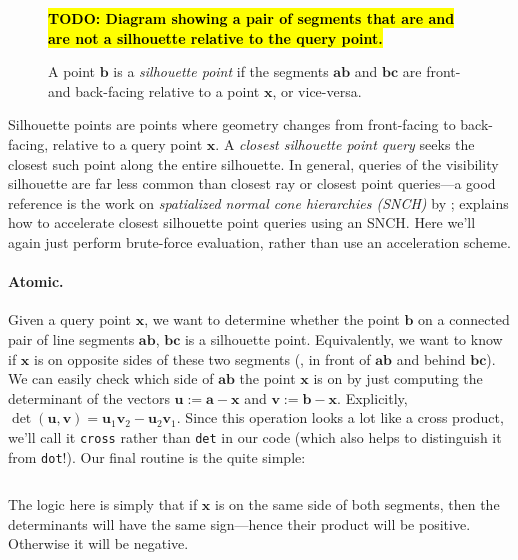 \documentclass{article}
\newcommand{\code}[1]{\texttt{#1}}
\newcommand{\todo}[1]{\textbf{\hl{TODO: #1}}}
\renewcommand{\vec}[1]{\textbf{#1}}
\begin{document}
\begin{figure}[h!]
   \todo{Diagram showing a pair of segments that are and are not a silhouette relative to the query point.}
   \caption{A point \(\vec{b}\) is a \emph{silhouette point} if the segments \(\vec{a}\vec{b}\) and \(\vec{b}\vec{c}\) are front- and back-facing relative to a point \(\vec{x}\), or vice-versa.}
\end{figure}

Silhouette points are points where geometry changes from front-facing to back-facing, relative to a query point \(\vec{x}\).  A \emph{closest silhouette point query} seeks the closest such point along the entire silhouette.  In general, queries of the visibility silhouette are far less common than closest ray or closest point queries---a good reference is the work on \emph{spatialized normal cone hierarchies (SNCH)} by \citet{johnson2001spatialized}; \citet[Section 5.1]{Sawhney:2023:WoSt} explains how to accelerate closest silhouette point queries using an SNCH.  Here we'll again just perform brute-force evaluation, rather than use an acceleration scheme.

\paragraph{Atomic.} Given a query point \(\vec{x}\), we want to determine whether the point \(\vec{b}\) on a connected pair of line segments \(\vec{a}\vec{b}\), \(\vec{b}\vec{c}\) is a silhouette point.  Equivalently, we want to know if \(\vec{x}\) is on opposite sides of these two segments (\eg{}, in front of \(\vec{a}\vec{b}\) and behind \(\vec{b}\vec{c}\)).  We can easily check which side of \(\vec{a}\vec{b}\) the point \(\vec{x}\) is on by just computing the determinant of the vectors \(\vec{u} := \vec{a}-\vec{x}\) and \(\vec{v} := \vec{b}-\vec{x}\).  Explicitly, \(\det(\vec{u},\vec{v}) = \vec{u}_1 \vec{v}_2 - \vec{u}_2 \vec{v}_1\).  Since this operation looks a lot like a cross product, we'll call it \code{cross} rather than \code{det} in our code (which also helps to distinguish it from \code{dot}!).  Our final routine is the quite simple:

\inputminted[fontsize=\small,linenos,firstline=43,lastline=46,bgcolor=bg]{cpp}{../code/WoStLaplace2D.cpp}

The logic here is simply that if \(\vec{x}\) is on the same side of both segments, then the determinants will have the same sign---hence their product will be positive.  Otherwise it will be negative.
\end{document}
